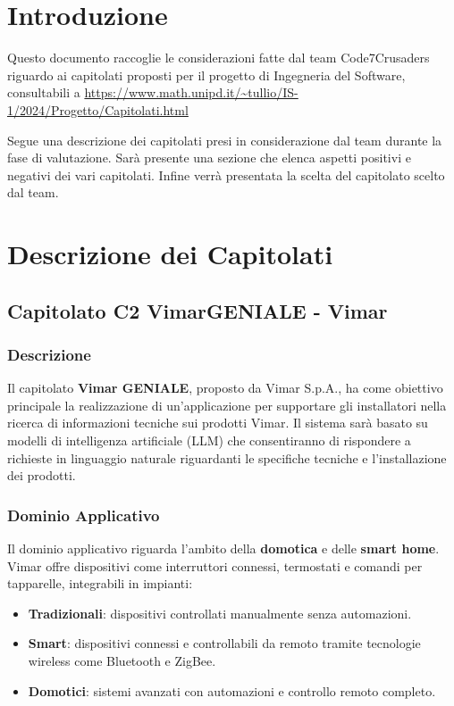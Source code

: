 \documentclass{article}
\begin{document}
\tableofcontents
\newpage

\section{Introduzione}

Questo documento raccoglie le considerazioni fatte dal team Code7Crusaders 
riguardo ai capitolati proposti per il progetto di Ingegneria del Software, 
consultabili a 
\newline
\url{https://www.math.unipd.it/~tullio/IS-1/2024/Progetto/Capitolati.html}
\newline

Segue una descrizione dei capitolati presi in considerazione dal team durante la fase di valutazione.
Sarà presente una sezione che elenca aspetti positivi e negativi dei vari capitolati.
Infine verrà presentata la scelta del capitolato scelto dal team.
\section{Descrizione dei Capitolati}

\subsection{Capitolato C2 VimarGENIALE - Vimar}

\subsubsection{Descrizione}

Il capitolato \textbf{Vimar GENIALE}, proposto da Vimar S.p.A., ha come obiettivo 
principale la realizzazione di un'applicazione per supportare gli installatori nella 
ricerca di informazioni tecniche sui prodotti Vimar. Il sistema sarà basato su modelli 
di intelligenza artificiale (LLM) che consentiranno di 
rispondere a richieste in linguaggio naturale riguardanti le specifiche tecniche e 
l'installazione dei prodotti.

\subsubsection{Dominio Applicativo}

Il dominio applicativo riguarda l'ambito della \textbf{domotica} e delle \textbf{smart home}. 
Vimar offre dispositivi come interruttori connessi, termostati e comandi per tapparelle, 
integrabili in impianti:
\begin{itemize}
    \item \textbf{Tradizionali}: dispositivi controllati manualmente senza automazioni.
    \item \textbf{Smart}: dispositivi connessi e controllabili da remoto tramite 
    tecnologie wireless come Bluetooth e ZigBee.
    \item \textbf{Domotici}: sistemi avanzati con automazioni e controllo remoto completo.
\end{itemize}
\end{document}
